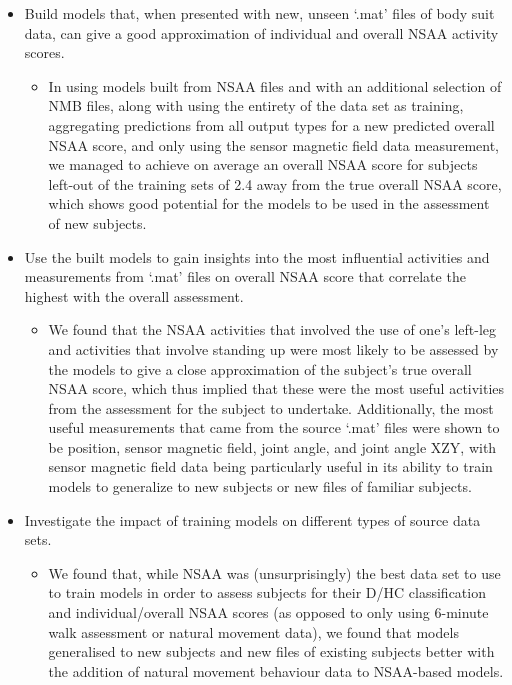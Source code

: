 \documentclass[12pt,twoside]{report}
\begin{document}
\begin{itemize}
	\item Build models that, when presented with new, unseen ‘.mat’ files of body suit data, can give a good approximation of individual and overall NSAA activity scores.
	\begin{itemize}
		\item In using models built from NSAA files and with an additional selection of NMB files, along with using the entirety of the data set as training, aggregating predictions from all output types for a new predicted overall NSAA score, and only using the sensor magnetic field data measurement, we managed to achieve on average an overall NSAA score for subjects left-out of the training sets of 2.4 away from the true overall NSAA score, which shows good potential for the models to be used in the assessment of new subjects.
	\end{itemize}
	\item Use the built models to gain insights into the most influential activities and measurements from ‘.mat’ files on overall NSAA score that correlate the highest with the overall assessment.
	\begin{itemize}
		\item We found that the NSAA activities that involved the use of one’s left-leg and activities that involve standing up were most likely to be assessed by the models to give a close approximation of the subject’s true overall NSAA score, which thus implied that these were the most useful activities from the assessment for the subject to undertake. Additionally, the most useful measurements that came from the source ‘.mat’ files were shown to be position, sensor magnetic field, joint angle, and joint angle XZY, with sensor magnetic field data being particularly useful in its ability to train models to generalize to new subjects or new files of familiar subjects.
	\end{itemize}
	\item Investigate the impact of training models on different types of source data sets.
	\begin{itemize}
		\item We found that, while NSAA was (unsurprisingly) the best data set to use to train models in order to assess subjects for their D/HC classification and individual/overall NSAA scores (as opposed to only using 6-minute walk assessment or natural movement data), we found that models generalised to new subjects and new files of existing subjects better with the addition of natural movement behaviour data to NSAA-based models.

\end{itemize}
\end{itemize}
\end{document}
